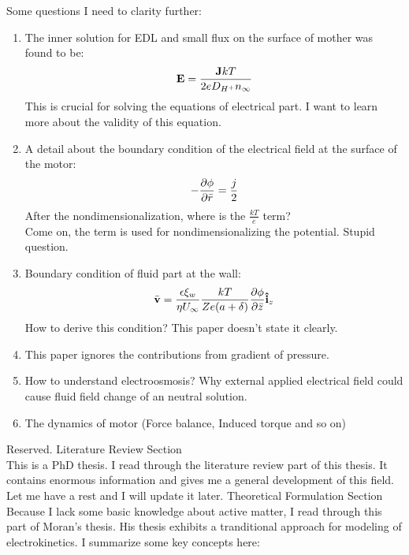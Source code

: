 \documentclass[fontsize=11pt, %
                             paper=a4, %
                             twoside, %
                             captions=tableheading,
                             index=totoc,
                             hyperref]{labbook}
\begin{document}
\begin{addmargin}[4cm]{0cm}
Some questions I need to clarity further:
\begin{enumerate}
\item
The inner solution for EDL and small flux on the surface of mother was found to be\cite{KlineIwataLammertEtAl2006}:
\begin{equation}
\mathbf{E} = \frac{\mathbf{J} k T}{2e D_{H^+}n_\infty}
\end{equation}
This is crucial for solving the equations of electrical part. I want to learn more about the validity of this equation.
\item
A detail about the boundary condition of the electrical field at the surface of the motor:
\begin{equation}
-\frac{\partial \phi}{\partial \bar{r}}=\frac{j}{2}
\end{equation}
After the nondimensionalization, where is the $\frac{kT}{e}$ term?\\
Come on, the term is used for nondimensionalizing the potential. Stupid question.
\item
Boundary condition of fluid part at the wall:
\begin{equation}
\bar{\mathbf{v}}=\frac{\epsilon\xi_w}{\eta U_\infty}\frac{kT}{Ze(a+\delta)}\frac{\partial \phi}{\partial \bar z}\mathbf{\hat{i}}_z
\end{equation}
How to derive this condition? This paper doesn't state it clearly.
\item
This paper ignores the contributions from gradient of pressure. 
\item
How to understand electroosmosis? Why external applied electrical field could cause fluid field change of an neutral solution.
\item
The dynamics of motor (Force balance, Induced torque and so on)
\end{enumerate}  
Reserved.
Literature Review Section\\
This is a PhD thesis. I read through the literature review part of this thesis. It contains enormous information and gives me a general development of this field. Let me have a rest and I will update it later.
Theoretical Formulation Section\\
Because I lack some basic knowledge about active matter, I read through this part of Moran's thesis\cite{Moran2013}. His thesis exhibits a tranditional approach for modeling of electrokinetics. I summarize some key concepts here:

\end{addmargin}
\end{document}
